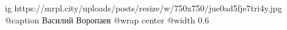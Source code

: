  
 
 
 
 

\ifcmt
  ig https://mrpl.city/uploads/posts/resize/w/750x750/jue0ad5fje7tri4y.jpg
	@caption Василий Воропаев
  @wrap center
  @width 0.6
\fi
